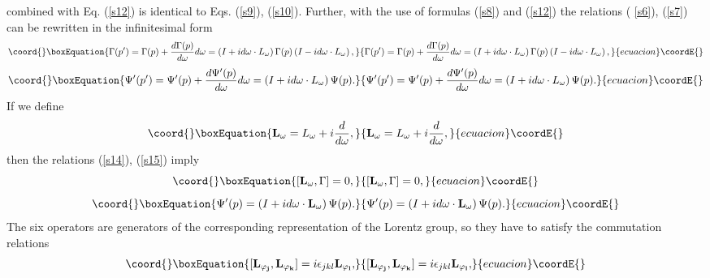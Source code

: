 \documentclass[a4paper,a4paper]{article}
\begin{document}
combined with Eq. (\ref{s12}) is identical to Eqs. (\ref{s9}), (\ref{s10}).
Further, with the use of formulas (\ref{s8}) and (\ref{s12}) the relations (%
\ref{s6}), (\ref{s7}) can be rewritten in the infinitesimal form 
\begin{equation}\coord{}\boxEquation{
\Gamma (p^{\prime })=\Gamma (p)+\frac{d\Gamma (p)}{d\omega }d\omega =\left(
I+id\omega \cdot L_{\omega }\right) \Gamma (p)\left( I-id\omega \cdot
L_{\omega }\right) ,  \label{s14}
}{
\Gamma (p^{\prime })=\Gamma (p)+\frac{d\Gamma (p)}{d\omega }d\omega =\left(
I+id\omega \cdot L_{\omega }\right) \Gamma (p)\left( I-id\omega \cdot
L_{\omega }\right) ,  }{ecuacion}\coordE{}\end{equation}%
\begin{equation}\coord{}\boxEquation{
\Psi ^{\prime }(p^{\prime })=\Psi ^{\prime }(p)+\frac{d\Psi ^{\prime }(p)}{
d\omega }d\omega =\left( I+id\omega \cdot L_{\omega }\right) \Psi (p).
\label{s15}
}{
\Psi ^{\prime }(p^{\prime })=\Psi ^{\prime }(p)+\frac{d\Psi ^{\prime }(p)}{
d\omega }d\omega =\left( I+id\omega \cdot L_{\omega }\right) \Psi (p).
}{ecuacion}\coordE{}\end{equation}%
If we define 
\begin{equation}\coord{}\boxEquation{
\mathbf{L_{\omega }}=L_{\omega }+i\frac{d}{d\omega },  \label{s16}
}{
\mathbf{L_{\omega }}=L_{\omega }+i\frac{d}{d\omega },  }{ecuacion}\coordE{}\end{equation}%
then the relations (\ref{s14}), (\ref{s15}) imply 
\begin{equation}\coord{}\boxEquation{
\lbrack \mathbf{L_{\omega }},\Gamma ]=0,  \label{s17}
}{
\lbrack \mathbf{L_{\omega }},\Gamma ]=0,  }{ecuacion}\coordE{}\end{equation}%
\begin{equation}\coord{}\boxEquation{
\Psi ^{\prime }(p)=\left( I+id\omega \cdot \mathbf{L_{\omega }}\right) \Psi
(p).  \label{s18}
}{
\Psi ^{\prime }(p)=\left( I+id\omega \cdot \mathbf{L_{\omega }}\right) \Psi
(p).  }{ecuacion}\coordE{}\end{equation}%
The six operators \coordHE{} are generators of the corresponding
representation of the Lorentz group, so they have to satisfy the commutation
relations 
\begin{equation}\coord{}\boxEquation{
\lbrack \mathbf{L_{\varphi _{j}}},\mathbf{L_{\varphi _{k}}}]=i\epsilon _{jkl}
\mathbf{L_{\varphi _{l}},}  \label{s19}
}{
\lbrack \mathbf{L_{\varphi _{j}}},\mathbf{L_{\varphi _{k}}}]=i\epsilon _{jkl}
\mathbf{L_{\varphi _{l}},}  }{ecuacion}\coordE{}\end{equation}%
\end{document}
